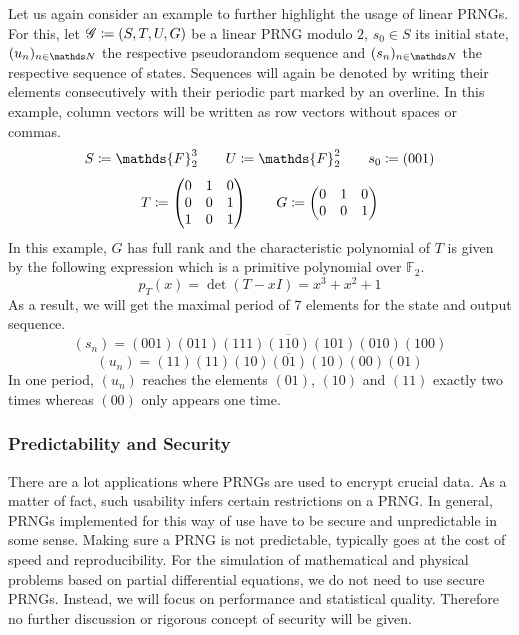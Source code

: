 \documentclass{stdlocal}
\begin{document}
  \noindent
  Let us again consider an example to further highlight the usage of linear PRNGs.
  For this, let $\mathscr{G}\coloneqq (S,T,U,G)$ be a linear PRNG modulo $2$, $s_0\in S$ its initial state, $(u_n)_{n\in\setNatural}$ the respective pseudorandom sequence and $(s_n)_{n\in\setNatural}$ the respective sequence of states.
  Sequences will again be denoted by writing their elements consecutively with their periodic part marked by an overline.
  In this example, column vectors will be written as row vectors without spaces or commas.
  \[
    S \define \mathds{F}_2^3
    \separate
    U \define \mathds{F}_2^2
    \separate
    s_0 \define (001)
  \]
  \[
    T \coloneqq
    \begin{pmatrix}
      0 & 1 & 0 \\
      0 & 0 & 1 \\
      1 & 0 & 1
    \end{pmatrix}
    \qquad
    G \coloneqq
    \begin{pmatrix}
      0 & 1 & 0 \\
      0 & 0 & 1
    \end{pmatrix}
  \]
  In this example, $G$ has full rank and the characteristic polynomial of $T$ is given by the following expression which is a primitive polynomial over $\mathds{F}_2$.
  \[
    p_T(x) = \det(T - xI) = x^3 + x^2 + 1
  \]
  As a result, we will get the maximal period of $7$ elements for the state and output sequence.
  \[
    (s_n) = \overline{(001)(011)(111)(110)(101)(010)(100)}
  \]
  \[
    (u_n) = \overline{(11)(11)(10)(01)(10)(00)(01)}
  \]
  In one period, $(u_n)$ reaches the elements $(01)$, $(10)$ and $(11)$ exactly two times whereas $(00)$ only appears one time.


  \subsubsection*{Predictability and Security}
  There are a lot applications where PRNGs are used to encrypt crucial data.
  As a matter of fact, such usability infers certain restrictions on a PRNG.
  In general, PRNGs implemented for this way of use have to be secure and unpredictable in some sense.
  Making sure a PRNG is not predictable, typically goes at the cost of speed and reproducibility.
  For the simulation of mathematical and physical problems based on partial differential equations, we do not need to use secure PRNGs.
  Instead, we will focus on performance and statistical quality.
  Therefore no further discussion or rigorous concept of security will be given.
\end{document}
